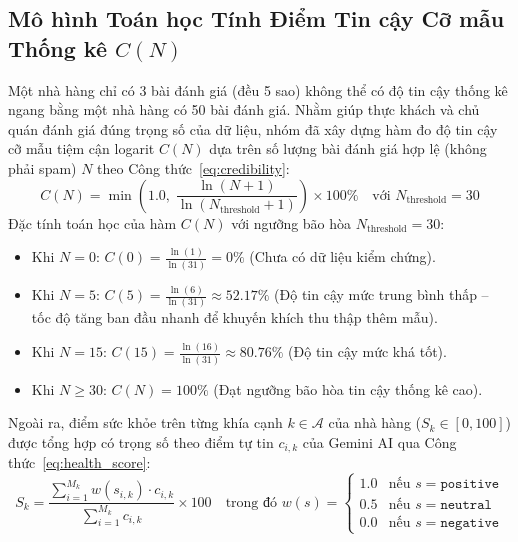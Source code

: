 \documentclass[12pt, a4paper]{article}
\begin{document}
\subsection{Mô hình Toán học Tính Điểm Tin cậy Cỡ mẫu Thống kê $C(N)$}
Một nhà hàng chỉ có 3 bài đánh giá (đều 5 sao) không thể có độ tin cậy thống kê ngang bằng một nhà hàng có 50 bài đánh giá. Nhằm giúp thực khách và chủ quán đánh giá đúng trọng số của dữ liệu, nhóm đã xây dựng hàm đo độ tin cậy cỡ mẫu tiệm cận logarit $C(N)$ dựa trên số lượng bài đánh giá hợp lệ (không phải spam) $N$ theo Công thức~\eqref{eq:credibility}:
\begin{equation}
\label{eq:credibility}
    C(N) = \min\left( 1.0,\; \frac{\ln(N + 1)}{\ln(N_{\text{threshold}} + 1)} \right) \times 100\% \quad \text{với } N_{\text{threshold}} = 30
\end{equation}
Đặc tính toán học của hàm $C(N)$ với ngưỡng bão hòa $N_{\text{threshold}} = 30$:
\begin{itemize}[leftmargin=1.2cm]
    \item Khi $N = 0$: $C(0) = \frac{\ln(1)}{\ln(31)} = 0\%$ (Chưa có dữ liệu kiểm chứng).
    \item Khi $N = 5$: $C(5) = \frac{\ln(6)}{\ln(31)} \approx 52.17\%$ (Độ tin cậy mức trung bình thấp -- tốc độ tăng ban đầu nhanh để khuyến khích thu thập thêm mẫu).
    \item Khi $N = 15$: $C(15) = \frac{\ln(16)}{\ln(31)} \approx 80.76\%$ (Độ tin cậy mức khá tốt).
    \item Khi $N \ge 30$: $C(N) = 100\%$ (Đạt ngưỡng bão hòa tin cậy thống kê cao).
\end{itemize}

Ngoài ra, điểm sức khỏe trên từng khía cạnh $k \in \mathcal{A}$ của nhà hàng ($S_k \in [0, 100]$) được tổng hợp có trọng số theo điểm tự tin $c_{i,k}$ của Gemini AI qua Công thức~\eqref{eq:health_score}:
\begin{equation}
\label{eq:health_score}
    S_k = \frac{\sum_{i=1}^{M_k} w(s_{i,k}) \cdot c_{i,k}}{\sum_{i=1}^{M_k} c_{i,k}} \times 100 \quad \text{trong đó } w(s) = \begin{cases} 1.0 & \text{nếu } s = \texttt{positive} \\ 0.5 & \text{nếu } s = \texttt{neutral} \\ 0.0 & \text{nếu } s = \texttt{negative} \end{cases}
\end{equation}

\newpage
\end{document}
